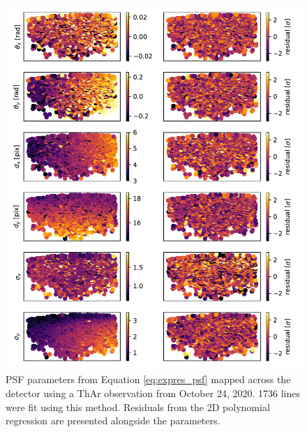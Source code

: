 \begin{figure}
    \centering
    \includegraphics[width=\textwidth]{figures-5/psf-params-2d.pdf}
    \caption{PSF parameters from Equation \ref{eq:expres_psf} mapped across the detector using a ThAr observation from October 24, 2020. 1736 lines were fit using this method. Residuals from the 2D polynomial regression are presented alongside the parameters.}
    \label{fig:psf-params-2d}
\end{figure}

